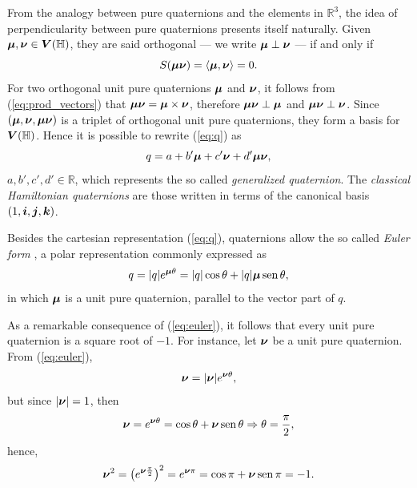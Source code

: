 From the analogy between pure quaternions and the elements in $ \mathbb{R}^3 $, the idea of perpendicularity between pure quaternions presents itself naturally. Given $ \boldsymbol{\mu},  \boldsymbol{\nu} \in \boldsymbol{V}(\mathbb{H})$, they are said orthogonal --- we write $ \boldsymbol{\mu} \perp \boldsymbol{\nu} $ --- if and only if
\begin{equation}
S(\boldsymbol{\mu} \boldsymbol{\nu}) = \langle \boldsymbol{\mu}, \boldsymbol{\nu} \rangle = 0.
\end{equation}
For two orthogonal unit pure quaternions $ \boldsymbol{\mu} $ and $ \boldsymbol{\nu} $, it follows from (\ref{eq:prod_vectors}) that $ \boldsymbol{\mu} \boldsymbol{\nu}  = \boldsymbol{\mu} \times \boldsymbol{\nu}$, therefore $ \boldsymbol{\mu} \boldsymbol{\nu} \perp \boldsymbol{\mu} $ and $ \boldsymbol{\mu} \boldsymbol{\nu} \perp \boldsymbol{\nu} $. Since $ (\boldsymbol{\mu}, \boldsymbol{\nu}, \boldsymbol{\mu} \boldsymbol{\nu}) $ is a triplet of orthogonal unit pure quaternions, they form a basis for $ \boldsymbol{V} (\mathbb{H}) $. Hence it is possible to rewrite (\ref{eq:q}) as
\begin{equation}
\label{eq:quat_generalizado}
q = a + b'\boldsymbol{\mu} + c'\boldsymbol{\nu} + d'\boldsymbol{\mu} \boldsymbol{\nu},
\end{equation}
$a, b', c', d' \in \mathbb{R}$,
which represents the so called \emph{generalized quaternion}. The \emph{classical Hamiltonian quaternions} are those written in terms of the canonical basis $ (1, \boldsymbol{i}, \boldsymbol{j}, \boldsymbol{k}) $.


Besides the cartesian representation (\ref{eq:q}), quaternions allow the so called \emph{Euler form} \cite{ell2014quaternion}, a polar representation commonly expressed as
\begin{equation}
\label{eq:euler}
q = |q| e^{\boldsymbol{\mu} \theta} = |q|\cos \theta + |q|\boldsymbol{\mu} \mathrm{\, sen \,} \theta,
\end{equation}
in which $ \boldsymbol{\mu} $ is a unit pure quaternion, parallel to the vector part of $ q $.

As a remarkable consequence of (\ref{eq:euler}), it follows that every unit pure quaternion is a square root of $-1$. For instance, let $ \boldsymbol{\nu} $ be a unit pure quaternion. From (\ref{eq:euler}),
\begin{equation}
\boldsymbol{\nu} = |\boldsymbol{\nu}| e^{\boldsymbol{\nu} \theta},
\end{equation}
but since $ |\boldsymbol{\nu}| = 1 $, then
\begin{equation}
\boldsymbol{\nu} = e^{\boldsymbol{\nu} \theta}  = \cos \theta + \boldsymbol{\nu} \mathrm{\, sen \,} \theta \Rightarrow \theta = \frac{\pi}{2},
\end{equation}
hence,
\begin{equation}
\boldsymbol{\nu}^2 = \left( e^{ \boldsymbol{\nu} \frac{\pi}{2}} \right)^2 = e^{\boldsymbol{\nu} \pi} = \cos \pi + \boldsymbol{\nu} \mathrm{\, sen \,} \pi = -1.
\end{equation}

